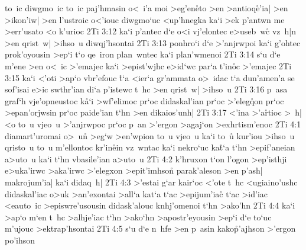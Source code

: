 to~ic
diwgmo~ic
to~ic
paj'hmasin
o<~i'a
moi
>eg'en\r{e}to
>en
>antioq\r{e}'ia|
>en
>ikon'iw|
>en
l'ustroic
o<'iouc
diwgmo`uc
<up'hnegka
ka`i
>ek
p'antwn
me
>err'usato
<o
k'urioc\bibvsend
\vs 2Ti 3:12
ka`i
p'antec
d`e
o<i
vj'elontec
e>useb~wc\r{}
vz~h|n
>en
qrist~w|
>ihso~u
diwqj'hsontai\bibvsend
\vs 2Ti 3:13
ponhro`i
d`e
>'anjrwpoi
ka`i
g'ohtec
prok'oyousin
>ep`i
t`o
qe~iron
plan~wntec
ka`i
plan'wmenoi\bibvsend
\vs 2Ti 3:14
s`u
d`e
m'ene
>en
o<~ic
>'emajec
ka`i
>epist'wjhc
e>id`wc
par`a
t'in\r{o}c
>'emajec\bibvsend
\vs 2Ti 3:15
ka`i
<'oti
>ap`o
vbr'efouc
\r{t}`a
<ier`a
gr'ammata
o>~idac
t`a
dun'amen'a
se
sof'isai
e>ic
swthr'ian
di`a
p'istewc
t~hc
>en
qrist~w|
>ihso~u\bibvsend
\vs 2Ti 3:16
p~asa
graf`h
vje'opneustoc
k\r{a}`i
>wf'elimoc
pr`oc
didaskal'ian
pr`oc
>'eleg\r{q}on
pr`oc
>epan'orjwsin
pr`oc
paide'ian
t`hn
>en
dikaios'unh|\bibvsend
\vs 2Ti 3:17
<'ina
>'a\r{r}tioc
>~h|
<o
to~u
vjeo~u
>'anjrwpoc
pr`oc
p~an
>'ergon
>agaj`on
>exhrtism'enoc\bibvsend
\vs 2Ti 4:1
diamart'uromai
o>~un\r{}
>eg`w
>en'wpion
to~u
vjeo~u
ka`i
to~u\r{}
kur'iou
>ihso~u
qristo~u
to~u
m'ellontoc
kr'in\r{e}in
vz~wntac
ka`i
nekro`uc
ka\r{t}`a
t`hn
>epif'aneian
a>uto~u
ka`i
t`hn
vbasile'ian
a>uto~u\bibvsend
\vs 2Ti 4:2
k'hruxon
t`on
l'ogon
>ep'isthji
e>uka'irwc
>aka'irwc
>'elegxon
>epit'imhson\r{}
parak'aleson
>en
p'ash|
makrojum'ia|
ka`i
didaq~h|\bibvsend
\vs 2Ti 4:3
>'estai
g`ar
kair`oc
<'ote
t~hc
<ugiaino'ushc
didaskal'iac
o>uk
>an'exontai
>all`a
kat`a
t`ac
>epijum'iac\r{}
t`ac
>id'iac
<eauto~ic
>episwre'usousin
didask'alouc
knhj'omenoi
t`hn
>ako'hn\bibvsend
\vs 2Ti 4:4
ka`i
>ap`o
m`en
t~hc
>alhje'iac
t`hn
>ako`hn
>apostr'eyousin
>ep`i
d`e
to`uc
m'ujouc
>ektrap'hsontai\bibvsend
\vs 2Ti 4:5
s`u
d`e
n~hfe
>en
p~asin
kako\r{p}'ajhson
>'ergon
po'ihson
